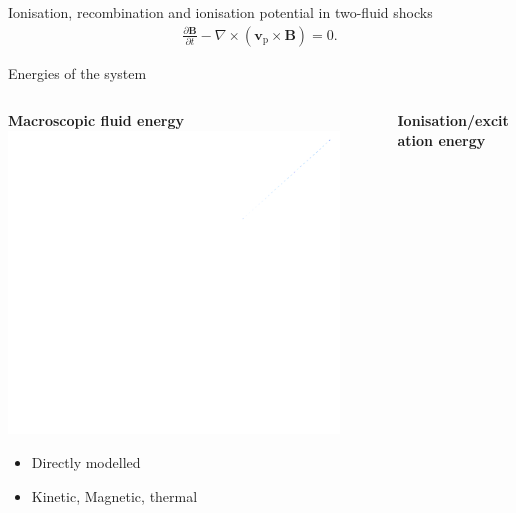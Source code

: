 \documentclass[10pt,aspectratio=169,usenames,dvipsnames]{beamer}
\begin{document}
\begin{frame}{Ionisation, recombination and ionisation potential in two-fluid shocks}
\begin{gather}
\frac{\partial \textbf{B}}{\partial t} - \nabla \times (\textbf{v}_{\text{p}} \times \textbf{B}) = 0.\tag{11}
\end{gather}
\end{frame}

\begin{frame}{Energies of the system}
\begin{columns}
\begin{column}{0.3\textwidth}
\centering
\textbf{Macroscopic fluid energy}
\includegraphics[width=0.9\textwidth]{2023StAndrewsAstro/Figures/fluidelement.png}
\begin{itemize}
    \item Directly modelled
    \item Kinetic, Magnetic, thermal
\end{itemize}
\end{column}
\begin{column}{0.3\textwidth}
\centering
\textbf{Ionisation/excitation energy}

\end{column}
\end{columns}
\end{frame}
\end{document}
